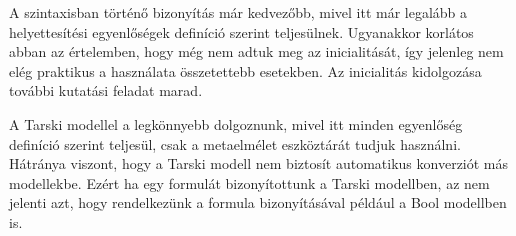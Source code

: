 A szintaxisban történő bizonyítás már kedvezőbb, mivel itt már legalább a helyettesítési egyenlőségek definíció szerint teljesülnek. Ugyanakkor korlátos abban az értelemben, hogy még nem adtuk meg az inicialitását, így jelenleg nem elég praktikus a használata összetettebb esetekben. Az inicialitás kidolgozása további kutatási feladat marad.

A Tarski modellel a legkönnyebb dolgoznunk, mivel itt minden egyenlőség definíció szerint teljesül, csak a metaelmélet eszköztárát tudjuk használni. Hátránya viszont, hogy a Tarski modell nem biztosít automatikus konverziót más modellekbe. Ezért ha egy formulát bizonyítottunk a Tarski modellben, az nem jelenti azt, hogy rendelkezünk a formula bizonyításával például a Bool modellben is.
